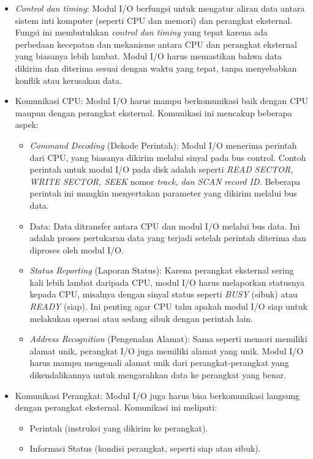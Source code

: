 \documentclass[12pt]{article}
\begin{document}
\begin{itemize} 
    \item \textit{Control dan timing}: Modul I/O berfungsi untuk mengatur aliran data antara sistem inti komputer (seperti CPU dan memori) dan perangkat eksternal. Fungsi ini membutuhkan \textit{control dan timing} yang tepat karena ada perbedaan kecepatan dan mekanisme antara CPU dan perangkat eksternal yang biasanya lebih lambat. Modul I/O harus memastikan bahwa data dikirim dan diterima sesuai dengan waktu yang tepat, tanpa menyebabkan konflik atau kerusakan data. 
    \item Komunikasi CPU: Modul I/O harus mampu berkomunikasi baik dengan CPU maupun dengan perangkat eksternal. Komunikasi ini mencakup beberapa aspek: 
    \begin{itemize} 
        \item \textit{Command Decoding} (Dekode Perintah): Modul I/O menerima perintah dari CPU, yang biasanya dikirim melalui sinyal pada bus control. Contoh perintah untuk modul I/O pada disk adalah seperti \textit{READ SECTOR, WRITE SECTOR, SEEK} nomor \textit{track, dan SCAN record ID.} Beberapa perintah ini mungkin menyertakan parameter yang dikirim melalui bus data. 
        \item Data: Data ditransfer antara CPU dan modul I/O melalui bus data. Ini adalah proses pertukaran data yang terjadi setelah perintah diterima dan diproses oleh modul I/O. 
        \item \textit{Status Reporting} (Laporan Status): Karena perangkat eksternal sering kali lebih lambat daripada CPU, modul I/O harus melaporkan statusnya kepada CPU, misalnya dengan sinyal status seperti \textit{BUSY} (sibuk) atau \textit{READY} (siap). Ini penting agar CPU tahu apakah modul I/O siap untuk melakukan operasi atau sedang sibuk dengan perintah lain. 
        \item \textit{Address Recognition} (Pengenalan Alamat): Sama seperti memori memiliki alamat unik, perangkat I/O juga memiliki alamat yang unik. Modul I/O harus mampu mengenali alamat unik dari perangkat-perangkat yang dikendalikannya untuk mengarahkan data ke perangkat yang benar. \end{itemize} 
    \item Komunikasi Perangkat: Modul I/O juga harus bisa berkomunikasi langsung dengan perangkat eksternal. Komunikasi ini meliputi: 
    \begin{itemize} 
        \item Perintah (instruksi yang dikirim ke perangkat). \item Informasi Status (kondisi perangkat, seperti siap atau sibuk). 

\end{itemize}
\end{itemize}
\end{document}
